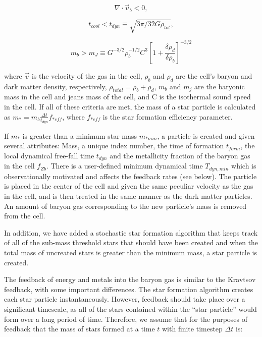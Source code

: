 \begin{equation}
\nabla \cdot \vec{v}_b < 0,
\label{cencont}
\end{equation}

\begin{equation}
t_{cool} < t_{dyn} \equiv \sqrt{3 \pi / 32G \rho_{tot}},
\end{equation}

\begin{equation}
m_{b} > m_{J} \equiv G^{-3/2} \rho_{b}^{-1/2}C^{3}
\left[ 1 + \frac{\delta\rho_{d}}{\delta\rho_{b}} \right]^{-3/2}
\end{equation}

where $\vec{v}$ is the velocity of the gas in the cell, $\rho_{b}$ and 
$\rho_{d}$ are the cell's baryon and dark matter density, respectively,
$\rho_{total} = \rho_{b} + \rho_{d}$, $m_{b}$ and $m_{j}$ are the 
baryonic mass in the cell and jeans mass of the cell, and C is the 
isothermal sound speed in the cell.  
If all of these criteria are met, 
the mass of a star particle is calculated as \(m_{*} = m_{b} 
\frac{ \Delta t}{ t_{dyn} } f_{*eff} \), 
where $f_{*eff}$ is the star formation efficiency parameter.

If $m_{*}$ is greater than a minimum star mass $m_{*min}$, a particle 
is created and given several attributes:  Mass, a unique index number, 
the time of formation $t_{form}$, the local dynamical free-fall time 
$t_{dyn}$ and the metallicity fraction of the baryon gas in the cell 
$f_{Zb}$.  There is a user-defined minimum dynamical time
$T_{dyn,min}$ which is observationally motivated and affects the
feedback rates (see below).
The particle is placed in the center of the cell and given 
the same peculiar velocity as the gas in the cell, and is then treated 
in the same manner as the dark matter particles.  An 
amount of baryon gas corresponding to the new particle's mass is 
removed from the cell.  

In addition, we have added a stochastic star formation algorithm that keeps 
track of all of the sub-mass threshold stars that should have been created 
and when the total mass of uncreated stars is greater than the minimum mass, 
a star particle is created.

The feedback of energy and metals into the baryon gas is similar to
the Kravtsov feedback, with some important differences.  The star formation 
algorithm creates each star particle instantaneously.  However, feedback
should take place over a significant timescale, as all of the stars contained
within the ``star particle'' would form over a long period of time.  Therefore,
we assume that for the purposes of feedback that the mass of stars formed
at a time $t$ with finite timestep $\Delta t$ is:

